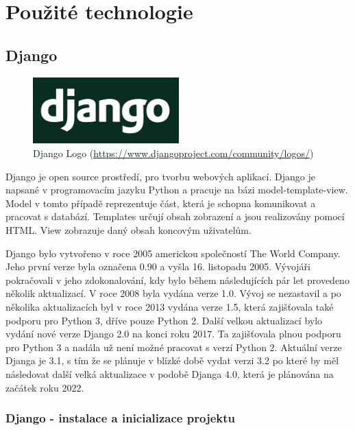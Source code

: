 \chapter{Použité technologie}
\label{2-technologie}

\section{Django}

\begin{figure}[H] \centering
  \includegraphics[width=160pt]{./pictures/django-logo.png}
    \caption[Django Logo]{Django Logo (\url{https://www.djangoproject.com/community/logos/})}
	\label{fig:Django Logo}                                
\end{figure}

Django je open source prostředí, pro tvorbu webových aplikací. Django
je napsané v programovacím jazyku Python a pracuje na bázi
model-template-view. Model v tomto případě reprezentuje část, která je
schopna komunikovat a pracovat s databází. Templates určují obsah
zobrazení a jsou realizovány pomocí HTML. View zobrazuje daný obsah
koncovým uživatelům.

Django bylo vytvořeno v roce 2005 americkou společností The World
Company. Jeho první verze byla označena 0.90 a vyšla 16. listopadu
2005. Vývojáři pokračovali v jeho zdokonalování, kdy bylo během
následujících pár let provedeno několik aktualizací. V roce 2008 byla
vydána verze 1.0. Vývoj se nezastavil a po několika aktualizacích byl v
roce 2013 vydána verze 1.5, která zajišťovala také podporu pro
Python 3, dříve pouze Python 2. Další velkou aktualizací bylo vydání nové
verze Django 2.0 na konci roku 2017. Ta zajišťovala plnou podporu pro
Python 3 a nadála už není možné pracovat s verzí Python 2. Aktuální
verze Djanga je 3.1, s tím že se plánuje v blízké době vydat verzi 3.2
po které by měl následovat další velká aktualizace v podobě Djanga 4.0,
která je plánována na začátek roku 2022. \cite{django}

\newpage


\subsection{Django - instalace a inicializace projektu}

